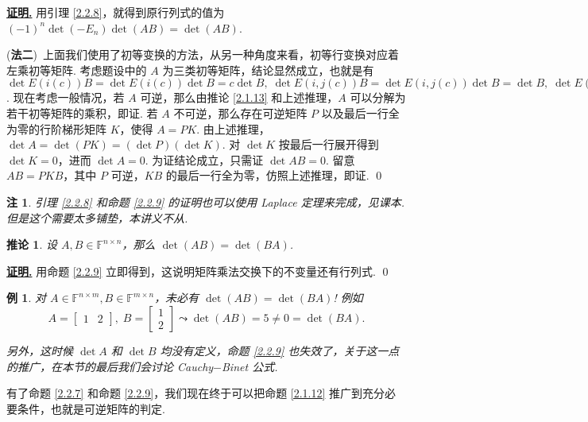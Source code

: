 \documentclass[10pt,openany]{article}
\theoremstyle{thmstyle} %
\theoremstyle{defstyle} %
\newtheorem{corollary}[theorem]{推论}
\theoremstyle{prostyle} %
\theoremstyle{exastyle}
\newtheorem{example}[theorem]{例}
\theoremstyle{remstyle}
\newtheorem{remark}[theorem]{注}
\renewenvironment{proof}[1][证明]{\par\underline{\textbf{#1.}} \;\fangsong}{\qed\par}
\newcommand{\F}{\mathbb{F}}
\newcommand{\n}{^{n \times n}}
\newcommand{\mn}{^{m \times n}}
\newcommand{\nm}{^{n \times m}}
\begin{document}
\begin{proof}
	用引理 \ref{2.2.8}，就得到原行列式的值为 \( (-1)^n \det(-E_n) \det (AB)=\det (AB) \).
	
	\vspace{1ex}
	
	(\textbf{法二})\ 上面我们使用了初等变换的方法，从另一种角度来看，初等行变换对应着左乘初等矩阵. 考虑题设中的 \( A \) 为三类初等矩阵，结论显然成立，也就是有 \( \det E(i(c))B=\det E(i(c)) \det B=c\det B, \; \det E(i,j(c))B=\det E(i,j(c))\det B=\det B, \;  \det E(i,j)B=\det E(i,j)\det B=\det B \).
	现在考虑一般情况，若 \( A \) 可逆，那么由推论 \ref{2.1.13} 和上述推理，\( A \) 可以分解为若干初等矩阵的乘积，即证. 若 \( A \) 不可逆，那么存在可逆矩阵 \( P \) 以及最后一行全为零的行阶梯形矩阵 \( K \)，使得 \( A=PK \). 由上述推理，\( \det A= \det (PK)= (\det P) (\det K) \). 对 \( \det K \) 按最后一行展开得到 \( \det K=0 \)，进而 \( \det A=0 \). 为证结论成立，只需证 \( \det AB=0 \). 留意 \( AB=PKB \)，其中 \( P \) 可逆，\( KB \) 的最后一行全为零，仿照上述推理，即证. 
\end{proof}

\begin{remark}
	引理 \ref{2.2.8} 和命题 \ref{2.2.9} 的证明也可以使用 Laplace 定理来完成，见课本. 但是这个需要太多铺垫，本讲义不从.
\end{remark}

\begin{corollary}
	设 \( A,B \in \F\n \)，那么 \( \det(AB)=\det(BA) \).
\end{corollary}

\begin{proof}
	用命题 \ref{2.2.9} 立即得到，这说明矩阵乘法交换下的不变量还有行列式.
\end{proof}

\begin{example}
	对 \( A \in \F\nm, B \in \F\mn \)，未必有 \( \det(AB)=\det(BA) \)! 例如
	\[ A= \begin{bmatrix}
		1 & 2
	\end{bmatrix}, \; B=\begin{bmatrix}
	1 \\ 2
	\end{bmatrix} \leadsto \det(AB)=5 \neq 0=\det(BA). \]
	
	 另外，这时候 \( \det A \) 和 \( \det B \) 均没有定义，命题 \ref{2.2.9} 也失效了，关于这一点的推广，在本节的最后我们会讨论 Cauchy\(-\)Binet 公式.
\end{example}

有了命题 \ref{2.2.7} 和命题 \ref{2.2.9}，我们现在终于可以把命题 \ref{2.1.12} 推广到充分必要条件，也就是可逆矩阵的判定.
\end{document}
